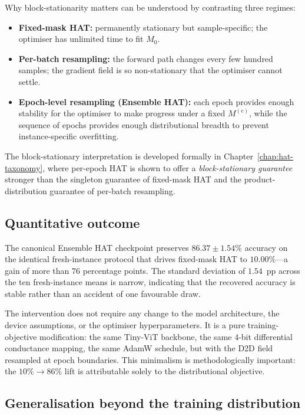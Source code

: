Why block-stationarity matters can be understood by contrasting three regimes:
\begin{itemize}
    \item \textbf{Fixed-mask HAT:} permanently stationary but sample-specific; the optimiser has unlimited time to fit $M_{0}$.
    \item \textbf{Per-batch resampling:} the forward path changes every few hundred samples; the gradient field is so non-stationary that the optimiser cannot settle.
    \item \textbf{Epoch-level resampling (Ensemble HAT):} each epoch provides enough stability for the optimiser to make progress under a fixed $M^{(e)}$, while the sequence of epochs provides enough distributional breadth to prevent instance-specific overfitting.
\end{itemize}

The block-stationary interpretation is developed formally in Chapter~\ref{chap:hat-taxonomy}, where per-epoch HAT is shown to offer a \emph{block-stationary guarantee} stronger than the singleton guarantee of fixed-mask HAT and the product-distribution guarantee of per-batch resampling.

\subsection{Quantitative outcome}

The canonical Ensemble HAT checkpoint preserves $86.37\pm1.54\%$ accuracy on the identical fresh-instance protocol that drives fixed-mask HAT to $10.00\%$---a gain of more than $76$ percentage points.  The standard deviation of $1.54$~pp across the ten fresh-instance means is narrow, indicating that the recovered accuracy is stable rather than an accident of one favourable draw.

The intervention does not require any change to the model architecture, the device assumptions, or the optimiser hyperparameters.  It is a pure training-objective modification: the same Tiny-ViT backbone, the same 4-bit differential conductance mapping, the same AdamW schedule, but with the D2D field resampled at epoch boundaries.  This minimalism is methodologically important: the $10\% \rightarrow 86\%$ lift is attributable solely to the distributional objective.

\subsection{Generalisation beyond the training distribution}

